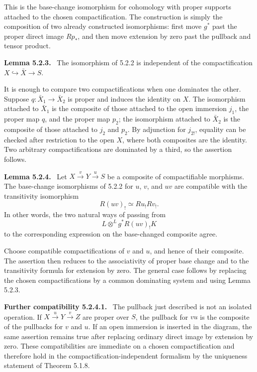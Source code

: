 \documentclass[12pt]{article}
\newenvironment{statement}[1]{\par\medskip\noindent\textbf{#1.}\ }{\par\medskip}
\newenvironment{remarktext}[1]{\par\medskip\noindent\textbf{#1.}\ }{\par\medskip}
\begin{document}
This is the base-change isomorphism for cohomology with proper supports attached to the chosen compactification. The construction is simply the composition of two already constructed isomorphisms: first move \(g^*\) past the proper direct image \(Rp_*\), and then move extension by zero past the pullback and tensor product.

\begin{statement}{Lemma 5.2.3}
The isomorphism of 5.2.2 is independent of the compactification \(X\hookrightarrow\bar X\to S\).
\end{statement}

It is enough to compare two compactifications when one dominates the other. Suppose \(q:\bar X_1\to\bar X_2\) is proper and induces the identity on \(X\). The isomorphism attached to \(\bar X_1\) is the composite of those attached to the open immersion \(j_1\), the proper map \(q\), and the proper map \(p_2\); the isomorphism attached to \(\bar X_2\) is the composite of those attached to \(j_2\) and \(p_2\). By adjunction for \(j_{2!}\), equality can be checked after restriction to the open \(X\), where both composites are the identity. Two arbitrary compactifications are dominated by a third, so the assertion follows.

\begin{statement}{Lemma 5.2.4}
Let \(X\xrightarrow{v}Y\xrightarrow{u}S\) be a composite of compactifiable morphisms. The base-change isomorphisms of 5.2.2 for \(u\), \(v\), and \(uv\) are compatible with the transitivity isomorphism
\[
R(uv)_!\simeq Ru_!Rv_!.
\]
In other words, the two natural ways of passing from
\[
L\otimes^L g^*R(uv)_!K
\]
to the corresponding expression on the base-changed composite agree.
\end{statement}

Choose compatible compactifications of \(v\) and \(u\), and hence of their composite. The assertion then reduces to the associativity of proper base change and to the transitivity formula for extension by zero. The general case follows by replacing the chosen compactifications by a common dominating system and using Lemma 5.2.3.



\begin{remarktext}{Further compatibility 5.2.4.1}
The pullback just described is not an isolated operation. If \(X\xrightarrow{u}Y\xrightarrow{v}Z\) are proper over \(S\), the pullback for \(vu\) is the composite of the pullbacks for \(v\) and \(u\). If an open immersion is inserted in the diagram, the same assertion remains true after replacing ordinary direct image by extension by zero. These compatibilities are immediate on a chosen compactification and therefore hold in the compactification-independent formalism by the uniqueness statement of Theorem 5.1.8.
\end{remarktext}
\end{document}
